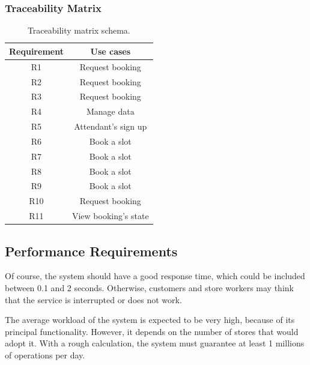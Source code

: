 \documentclass[table, 12pt]{article}
\begin{document}
\subsubsection{Traceability Matrix}
\begin{table}[H]
    \begin{center}
        \begin{tabular}{|c| c|}
            \hline
            \textbf{Requirement} & \textbf{Use cases}   \\
            \hline
            R1                   & Request booking      \\
            R2                   & Request booking      \\
            R3                   & Request booking      \\
            R4                   & Manage data          \\
            R5                   & Attendant's sign up  \\
            R6                   & Book a slot          \\
            R7                   & Book a slot          \\
            R8                   & Book a slot          \\
            R9                   & Book a slot          \\
            R10                  & Request booking      \\
            R11                  & View booking's state \\
            \hline
        \end{tabular}
        \caption{Traceability matrix schema.}
    \end{center}
\end{table}


\subsection{Performance Requirements}
Of course, the system should have a good response time, which could be included between 0.1 and 2 seconds.
Otherwise, customers and store workers may think that the service is interrupted or does not work.

The average workload of the system is expected to be very high, because of its principal functionality. However, it depends on the number of stores that would adopt it.
With a rough calculation, the system must guarantee at least 1 millions of operations per day.
\end{document}
